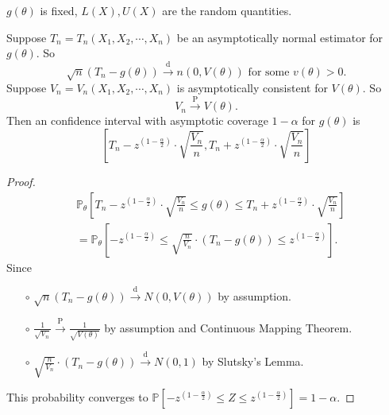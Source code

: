 \documentclass[a4paper]{article}
\begin{document}
\begin{note}
	$g(\theta)$ is fixed, $L(X),U(X)$ are the random quantities.
\end{note}

\begin{prop}
	Suppose $T_n = T_n(X_1,X_2,\cdots,X_n)$ be an asymptotically normal estimator for $g(\theta)$. So
	\begin{equation*}
		\sqrt{n}(T_n-g(\theta)) \stackrel{\text{d}}{\longrightarrow} n(0,V(\theta)) \text{ for some } v(\theta) > 0.
	\end{equation*}
	Suppose $V_n = V_n(X_1,X_2,\cdots,X_n)$ is asymptotically consistent for $V(\theta)$. So
	\begin{equation*}
		V_n \stackrel{\text{P}}{\longrightarrow} V(\theta).
	\end{equation*}
	Then an confidence interval with asymptotic coverage $1-\alpha$ for $g(\theta)$ is
	\begin{equation}
		\left[T_n - z^{(1-\frac{\alpha}{2})} \cdot \sqrt{\frac{V_n}{n}}, T_n + z^{(1-\frac{\alpha}{2})} \cdot \sqrt{\frac{V_n}{n}}\right]
	\end{equation}
\end{prop}

\begin{proof}
	\begin{equation*}
		\begin{aligned}
			& \mathbb{P}_{\theta}\left[T_n - z^{(1-\frac{\alpha}{2})} \cdot \sqrt{\frac{V_n}{n}} \leq g(\theta) \leq T_n + z^{(1-\frac{\alpha}{2})} \cdot \sqrt{\frac{V_n}{n}}\right] \\
			&= \mathbb{P}_{\theta}\left[- z^{(1-\frac{\alpha}{2})} \leq \sqrt{\frac{n}{V_n}} \cdot (T_n - g(\theta)) \leq z^{(1-\frac{\alpha}{2})}\right].
		\end{aligned}
	\end{equation*}
	Since
	\begin{itemize}
		\item[$\circ$] $\sqrt{n}(T_n-g(\theta)) \stackrel{\text{d}}{\longrightarrow} N(0,V(\theta))$ by assumption.
		\item[$\circ$] $\frac{1}{\sqrt{V_n}} \stackrel{\text{P}}{\longrightarrow} \frac{1}{\sqrt{V(\theta)}}$ by assumption and Continuous Mapping Theorem.
		\item[$\circ$] $\sqrt{\frac{n}{V_n}} \cdot (T_n - g(\theta)) \stackrel{\text{d}}{\longrightarrow} N(0,1)$ by Slutsky's Lemma.
	\end{itemize}
	This probability converges to $\mathbb{P}[- z^{(1-\frac{\alpha}{2})} \leq Z \leq z^{(1-\frac{\alpha}{2})}] = 1-\alpha$.
\end{proof}
\end{document}
